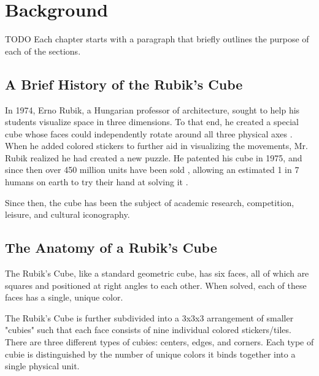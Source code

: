 
\chapter{Background} %

\label{Chapter2} %

TODO Each chapter starts with a paragraph that briefly outlines the purpose of each of the sections.


\section{A Brief History of the Rubik's Cube}
\label{sec:rubiks-history}
In 1974, Erno Rubik, a Hungarian professor of architecture, sought to help his students visualize space in three dimensions. 
To that end, he created a special cube whose faces could independently rotate around all three physical axes \cite{rubik-motivation}.
When he added colored stickers to further aid in visualizing the movements, Mr. Rubik realized he had created a new puzzle.
He patented his cube in 1975, \cite{rubik-patent} and since then over 450 million units have been sold \cite{forbes-rubik-merger}, allowing an estimated 1 in 7 humans on earth to try their hand at solving it \cite{rubik-population-reached}.

Since then, the cube has been the subject of academic research, competition, leisure, and cultural iconography.


\section{The Anatomy of a Rubik's Cube}
\label{sec:rubiks-anatomy}
The Rubik's Cube, like a standard geometric cube, has six faces, all of which are squares and positioned at right angles to each other.
When solved, each of these faces has a single, unique color.

The Rubik's Cube is further subdivided into a 3x3x3 arrangement of smaller "cubies" such that each face consists of nine individual colored stickers/tiles. 
There are three different types of cubies: centers, edges, and corners.
Each type of cubie is distinguished by the number of unique colors it binds together into a single physical unit.

